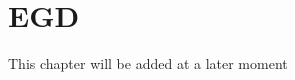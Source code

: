 \chapter[EGD][EGD]{EGD}\label{chap:EGD}

\begin{ChapterAbstract}
This chapter will be added at a later moment
\end{ChapterAbstract}
